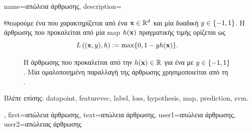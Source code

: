 {name={\foreignlanguage{greek}{απώλεια άρθρωσης}}, 
	description={\foreignlanguage{greek}{Θεωρούμε ένα} 
		 \foreignlanguage{greek}{που χαρακτηρίζεται από ένα}  ${\bf x} \in \mathbb{R}^{d}$ 
		\foreignlanguage{greek}{και μία δυαδική}  $y \in \{-1,1\}$. \foreignlanguage{greek}{Η}  
		\foreignlanguage{greek}{άρθρωσης που προκαλείται από μία} \gls{map}  $h({\bf x})$ 
		\foreignlanguage{greek}{πραγματικής τιμής ορίζεται ως} 
		\begin{equation} 
			\label{equ_hinge_loss_gls_dict}
			L\left(({\bf x},y),h \right) := \max \{ 0 , 1 - y h({\bf x}) \}. 
		\end{equation}
		\begin{figure}[H]
		\begin{center}
		{
		\caption{\foreignlanguage{greek}{Η}  \foreignlanguage{greek}{άρθρωσης που προκαλείται από την}  
		$h({\bf x}) \in \mathbb{R}$ \foreignlanguage{greek}{για ένα}  \foreignlanguage{greek}{με} 
		 $y \in \{-1,1\}$. \foreignlanguage{greek}{Μία ομαλοποιημένη παραλλαγή της}  
		\foreignlanguage{greek}{άρθρωσης χρησιμοποιείται από τη}  \cite{LampertNowKernel}.}
		\label{fig_hingeloss_dict}}
		\end{center}
		\end{figure} 
	    	\foreignlanguage{greek}{Βλέπε επίσης:} \gls{datapoint}, \gls{featurevec}, \gls{label}, \gls{loss}, \gls{hypothesis}, \gls{map}, \gls{prediction}, \gls{svm}.},
	first={\foreignlanguage{greek}{απώλεια άρθρωσης}},
	text={\foreignlanguage{greek}{απώλεια άρθρωσης}},
	user1={\foreignlanguage{greek}{απώλεια άρθρωσης}}, %
	user2={\foreignlanguage{greek}{απώλειας άρθρωσης}} %
}

